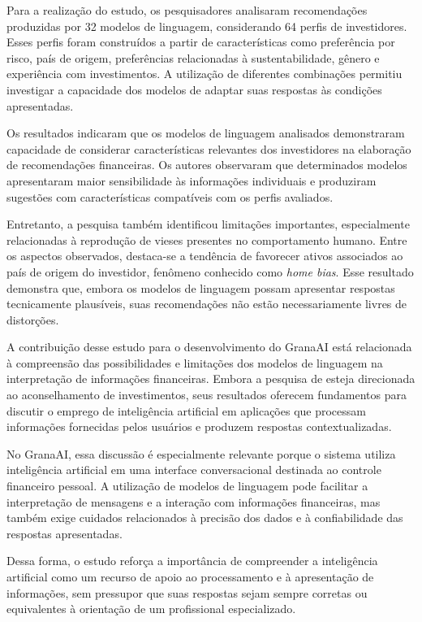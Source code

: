 Para a realização do estudo, os pesquisadores analisaram recomendações produzidas por 32 modelos de linguagem, considerando 64 perfis de investidores. Esses perfis foram construídos a partir de características como preferência por risco, país de origem, preferências relacionadas à sustentabilidade, gênero e experiência com investimentos. A utilização de diferentes combinações permitiu investigar a capacidade dos modelos de adaptar suas respostas às condições apresentadas.

Os resultados indicaram que os modelos de linguagem analisados demonstraram capacidade de considerar características relevantes dos investidores na elaboração de recomendações financeiras. Os autores observaram que determinados modelos apresentaram maior sensibilidade às informações individuais e produziram sugestões com características compatíveis com os perfis avaliados.

Entretanto, a pesquisa também identificou limitações importantes, especialmente relacionadas à reprodução de vieses presentes no comportamento humano. Entre os aspectos observados, destaca-se a tendência de favorecer ativos associados ao país de origem do investidor, fenômeno conhecido como \textit{home bias}. Esse resultado demonstra que, embora os modelos de linguagem possam apresentar respostas tecnicamente plausíveis, suas recomendações não estão necessariamente livres de distorções.

A contribuição desse estudo para o desenvolvimento do GranaAI está relacionada à compreensão das possibilidades e limitações dos modelos de linguagem na interpretação de informações financeiras. Embora a pesquisa de  esteja direcionada ao aconselhamento de investimentos, seus resultados oferecem fundamentos para discutir o emprego de inteligência artificial em aplicações que processam informações fornecidas pelos usuários e produzem respostas contextualizadas.

No GranaAI, essa discussão é especialmente relevante porque o sistema utiliza inteligência artificial em uma interface conversacional destinada ao controle financeiro pessoal. A utilização de modelos de linguagem pode facilitar a interpretação de mensagens e a interação com informações financeiras, mas também exige cuidados relacionados à precisão dos dados e à confiabilidade das respostas apresentadas.

Dessa forma, o estudo reforça a importância de compreender a inteligência artificial como um recurso de apoio ao processamento e à apresentação de informações, sem pressupor que suas respostas sejam sempre corretas ou equivalentes à orientação de um profissional especializado.

